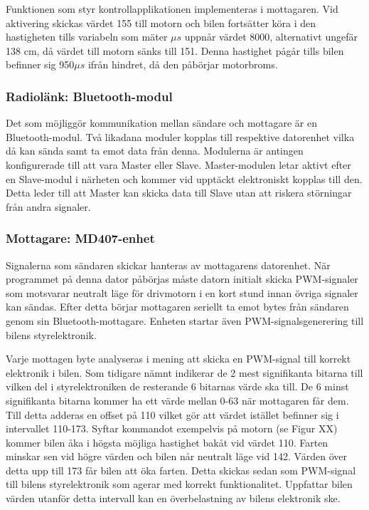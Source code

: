 \documentclass[a4paper]{article}
\begin{document}
Funktionen som styr kontrollapplikationen implementeras i mottagaren. Vid aktivering skickas värdet 155 till motorn  och bilen fortsätter köra i den hastigheten tills variabeln som mäter $\mu s$ uppnår värdet 8000, alternativt ungefär 138 cm, då värdet till motorn sänks till 151. Denna hastighet pågår tills bilen befinner sig 950$\mu s$ ifrån hindret, då den påbörjar motorbroms.


\subsubsection{Radiolänk: Bluetooth-modul}
Det som möjliggör kommunikation mellan sändare och mottagare är en Bluetooth-modul. Två likadana moduler kopplas till respektive datorenhet vilka då kan sända samt ta emot data från denna. Modulerna är antingen konfigurerade till att vara Master eller Slave. Master-modulen letar aktivt efter en Slave-modul i närheten och kommer vid upptäckt elektroniskt kopplas till den. Detta leder till att Master kan skicka data till Slave utan att riskera störningar från andra signaler.


\subsubsection{Mottagare: MD407-enhet}
Signalerna som sändaren skickar hanteras av mottagarens datorenhet. När programmet på denna dator påbörjas måste datorn initialt skicka PWM-signaler som motsvarar neutralt läge för drivmotorn i en kort stund innan övriga signaler kan sändas. Efter detta börjar mottagaren seriellt ta emot bytes från sändaren genom sin Bluetooth-mottagare. Enheten startar även PWM-signalsgenerering till bilens styrelektronik. 

\vspace{5mm} \noindent
Varje mottagen byte analyseras i mening att skicka en PWM-signal till korrekt elektronik i bilen. Som tidigare nämnt indikerar de 2 mest signifikanta bitarna till vilken del i styrelektroniken de resterande 6 bitarnas värde ska till. De 6 minst signifikanta bitarna kommer ha ett värde mellan 0-63 när mottagaren får dem. Till detta adderas en offset på 110 vilket gör att värdet istället befinner sig i intervallet 110-173. Syftar kommandot exempelvis på motorn (se Figur XX) kommer bilen åka i högsta möjliga hastighet bakåt vid värdet 110. Farten minskar sen vid högre värden och bilen når neutralt läge vid 142. Värden över detta upp till 173 får bilen att öka farten. Detta skickas sedan som PWM-signal till bilens styrelektronik som agerar med korrekt funktionalitet. Uppfattar bilen värden utanför detta intervall kan en överbelastning av bilens elektronik ske. 
\end{document}
